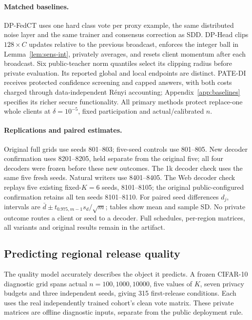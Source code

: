 \paragraph{Matched baselines.}
DP-FedCT uses one hard class vote per proxy example, the same distributed
noise layer and the same trainer and consensus correction as SDD.
DP-Head clips $128\times C$ updates relative to the previous broadcast,
enforces the integer ball in Lemma~\ref{lem:sens-int}, privately averages, and
resets client momentum after each broadcast. Six public-teacher norm quantiles
select its clipping radius before private evaluation. Its reported global and
local endpoints are distinct. PATE-DI receives protected confidence screening
and capped answers, with both costs charged through data-independent R\'enyi
accounting; Appendix~\ref{app:baselines} specifies its richer secure
functionality. All primary methods protect replace-one whole clients at
$\delta=10^{-5}$, fixed participation and actual/calibrated $n$.

\paragraph{Replications and paired estimates.}
Original full grids use seeds 801--803; five-seed controls use 801--805.
New decoder confirmation uses 8201--8205, held separate from the original five;
all four decoders were frozen before these new outcomes. The 1k decoder check
uses the same five fresh seeds. Natural writers use 8401--8405. The Web
decoder check replays five existing fixed-$K=6$ seeds, 8101--8105; the original
public-configured confirmation retains all ten seeds 8101--8110.
For paired seed differences $d_j$, intervals are
$\bar d\pm t_{0.975,m-1}s_d/\sqrt m$; tables show mean and sample SD.
No private outcome routes a client or seed to a decoder. Full schedules,
per-region matrices, all variants and original results remain in the artifact.

\subsection{Predicting regional release quality}
\label{sec:eval:quality}

The quality model accurately describes the object it predicts. A frozen
CIFAR-10 diagnostic grid spans actual $n=100,1000,10000$, five values of $K$,
seven privacy budgets and three independent seeds, giving 315 first-release
conditions. Each uses the real independently trained cohort's clean vote
matrix. These private matrices are offline diagnostic inputs, separate from
the public deployment rule.

